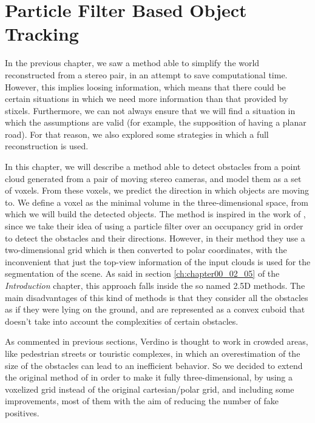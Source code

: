 
\graphicspath{{./images/chapter05/bmps/}{./images/chapter05/vects/}{./images/chapter05/}}

\chapter{Particle Filter Based Object Tracking}\label{ch:chapter05}

In the previous chapter, we saw a method able to simplify the world reconstructed from a stereo pair, in an attempt to save computational time. However, this implies loosing information, which means that there could be certain situations in which we need more information than that provided by stixels. Furthermore, we can not always ensure that we will find a situation in which the assumptions are valid (for example, the supposition of having a planar road). For that reason, we also explored some strategies in which a full reconstruction is used.

In this chapter, we will describe a method able to detect obstacles from a point cloud generated from a pair of moving stereo cameras, and model them as a set of voxels. From these voxels, we predict the direction in which objects are moving to. We define a voxel as the minimal volume in the three-dimensional space, from which we will build the detected objects. The method is inspired in the work of \cite{danescu2012particle}, since we take their idea of using a particle filter over an occupancy grid in order to detect the obstacles and their directions. However, in their method they use a two-dimensional grid which is then converted to polar coordinates, with the inconvenient that just the top-view information of the input clouds is used for the segmentation of the scene. As said in section \ref{ch:chapter00_02_05} of the \emph{Introduction} chapter, this approach falls inside the so named 2.5D methods. The main disadvantages of this kind of methods is that they consider all the obstacles as if they were lying on the ground, and are represented as a convex cuboid that doesn't take into account the complexities of certain obstacles.

As commented in previous sections, Verdino is thought to work in crowded areas, like pedestrian streets or touristic complexes, in which an overestimation of the size of the obstacles can lead to an inefficient behavior. So we decided to extend the original method of \cite{danescu2012particle} in order to make it fully three-dimensional, by using a voxelized grid instead of the original cartesian/polar grid, and including some improvements, most of them with the aim of reducing the number of fake positives.

